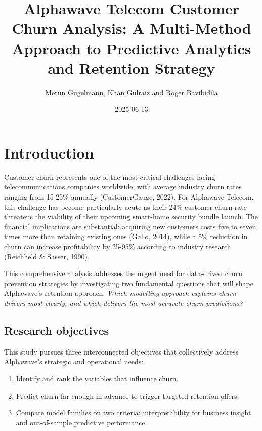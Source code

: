 \documentclass[
]{article}
\title{Alphawave Telecom Customer Churn Analysis: A Multi-Method
Approach to Predictive Analytics and Retention Strategy}
\author{Merun Gugelmann, Khan Gulraiz and Roger Bavibidila}
\date{2025-06-13}
\providecommand{\tightlist}{%
  \setlength{\itemsep}{0pt}\setlength{\parskip}{0pt}}
\begin{document}
\maketitle

{
\setcounter{tocdepth}{3}
\tableofcontents
}
\hypertarget{introduction}{%
\section{Introduction}\label{introduction}}

Customer churn represents one of the most critical challenges facing
telecommunications companies worldwide, with average industry churn
rates ranging from 15-25\% annually (CustomerGauge, 2022). For Alphawave
Telecom, this challenge has become particularly acute as their 24\%
customer churn rate threatens the viability of their upcoming smart-home
security bundle launch. The financial implications are substantial:
acquiring new customers costs five to seven times more than retaining
existing ones (Gallo, 2014), while a 5\% reduction in churn can increase
profitability by 25-95\% according to industry research (Reichheld \&
Sasser, 1990).

This comprehensive analysis addresses the urgent need for data-driven
churn prevention strategies by investigating two fundamental questions
that will shape Alphawave's retention approach: \emph{Which modelling
approach explains churn drivers most clearly, and which delivers the
most accurate churn predictions?}

\hypertarget{research-objectives}{%
\subsection{Research objectives}\label{research-objectives}}

This study pursues three interconnected objectives that collectively
address Alphawave's strategic and operational needs:

\begin{enumerate}
\def\labelenumi{\arabic{enumi}.}
\tightlist
\item
  Identify and rank the variables that influence churn.\\
\item
  Predict churn far enough in advance to trigger targeted retention
  offers.\\
\item
  Compare model families on two criteria: interpretability for business
  insight and out-of-sample predictive performance.
\end{enumerate}
\end{document}
